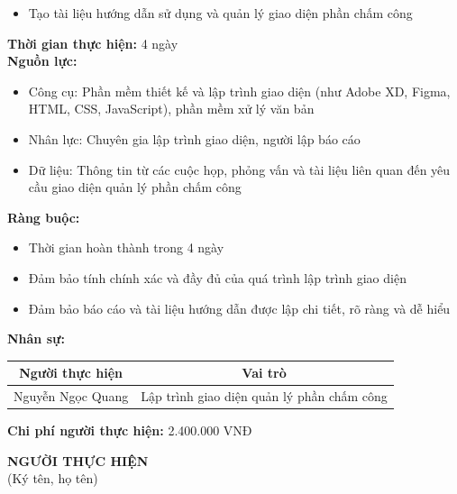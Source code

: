 {\begin{minipage}{\textwidth}
\begin{itemize}
        \item Tạo tài liệu hướng dẫn sử dụng và quản lý giao diện phần chấm công
    \end{itemize}
    \vspace{0.5cm}
    \noindent \textbf{Thời gian thực hiện:} 4 ngày \\
    \noindent \textbf{Nguồn lực:}
    \begin{itemize}
        \item Công cụ: Phần mềm thiết kế và lập trình giao diện (như Adobe XD, Figma, HTML, CSS, JavaScript), phần mềm xử lý văn bản
        \item Nhân lực: Chuyên gia lập trình giao diện, người lập báo cáo
        \item Dữ liệu: Thông tin từ các cuộc họp, phỏng vấn và tài liệu liên quan đến yêu cầu giao diện quản lý phần chấm công
    \end{itemize}
    \vspace{0.5cm}
    \noindent \textbf{Ràng buộc:}
    \begin{itemize}
        \item Thời gian hoàn thành trong 4 ngày
        \item Đảm bảo tính chính xác và đầy đủ của quá trình lập trình giao diện
        \item Đảm bảo báo cáo và tài liệu hướng dẫn được lập chi tiết, rõ ràng và dễ hiểu
    \end{itemize}
    \vspace{0.5cm}
    \noindent \textbf{Nhân sự:}
    \begin{longtable}{|c|c|}
    \hline
    \textbf{Người thực hiện} & \textbf{Vai trò} \\
    \hline
    Nguyễn Ngọc Quang & Lập trình giao diện quản lý phần chấm công \\
    \hline
    \end{longtable}
    \vspace{0.5cm}
    \noindent \textbf{Chi phí người thực hiện:} 2.400.000 VNĐ \\
    \vspace{1cm}
    \begin{flushleft}
        \hspace{8cm} \textbf{NGƯỜI THỰC HIỆN} \\
        \hspace{8.8cm} (Ký tên, họ tên) \\
        \vspace{1cm}
    \end{flushleft}
    \end{minipage}
}
% 
